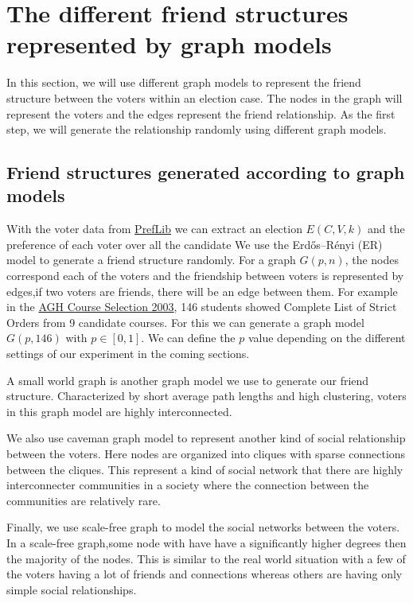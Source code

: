 \documentclass{article}
\begin{document}
\section{The different friend structures represented by graph models}
In this section, we will use different graph models to represent the friend structure between the voters within an election case. The nodes in the graph will represent the voters and the edges represent the friend relationship.  As the first step, we will generate the relationship randomly using different graph models.

\subsection{Friend structures generated according to graph models}

With the voter data from \href{https://www.preflib.org}{PrefLib} we can extract an election $E (C,V,k)$ and the preference of each voter over all the candidate We use the Erdős–Rényi (ER) model to generate a friend structure randomly. For a graph $G(p,n)$, the nodes correspond each of the voters and the friendship between voters is represented by edges,if two voters are friends, there will be an edge between them. For example in the \href{https://www.preflib.org/static/data/agh/00009-00000001.soc}{AGH Course Selection 2003}, 146 students showed Complete List of Strict Orders from 9 candidate courses. For this we can generate a graph model $G(p,146)$ with $p \in [0,1]$. We can define the $p$ value depending on the different settings of our experiment in the coming sections.

A small world graph is another graph model we use to generate our friend structure. Characterized by short average path lengths and high clustering, voters in this graph model are highly interconnected. 

We also use caveman graph model to represent another kind of social relationship between the voters. Here nodes are organized into cliques with sparse connections between the cliques. This represent a kind of social network that there are highly interconnecter communities in a society where the connection between the communities are relatively rare. 

Finally, we use scale-free graph to model the social networks between the voters. In a scale-free graph,some node with have have a significantly higher degrees then the majority of the nodes. This is similar to the real world situation with a few of the voters having a lot of friends and connections whereas others are having only simple social relationships.
\end{document}
